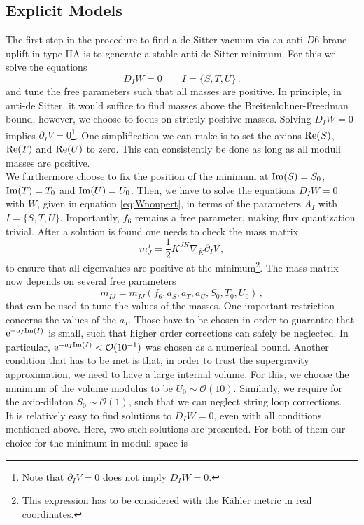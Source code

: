 \documentclass[a4paper,12pt,twoside,openright]{report}
\newcommand{\be}{\begin{equation}}
\newcommand{\ee}{\end{equation}}
\def\rme{{\rm e}}
\def\rmre{{\rm Re}}
\def\rmim{{\rm Im}}
\begin{document}
\subsection{Explicit Models}
\label{sec:uplfitbraneexamples}
The first step in the procedure to find a de Sitter vacuum via an anti-$D6$-brane uplift in type IIA is to generate a stable anti-de Sitter minimum. For this we solve the equations
\be 
D_I W = 0 \qquad I = \{S,T,U\}\,.
\ee
and tune the free parameters such that all masses are positive. In principle, in anti-de Sitter, it would suffice to find masses above the Breitenlohner-Freedman bound, however, we choose to focus on strictly positive masses. Solving $D_I W = 0$ implies $\partial_I V=0$\footnote{Note that $\partial_I V=0$ does not imply $D_I W = 0$.}. One simplification we can make is to set the axions $\rmre(S)$, $\rmre(T)$ and $\rmre(U)$ to zero. This can consistently be done as long as all moduli masses are positive.\\
We furthermore choose to fix the position of the minimum at $\rmim (S) = S_0$, $\rmim (T) = T_0$ and $\rmim (U) = U_0$. Then, we have to solve the equations $D_IW = 0$ with $W$, given in equation \eqref{eq:Wnonpert}, in terms of the parameters $A_I$ with $I = \{S,T,U\}$. Importantly, $f_6$ remains a free parameter, making flux quantization trivial. After a solution is found one needs to check the mass matrix
\be 
m_J^I = \frac{1}{2} K^{J\bar{K}} \nabla_{\bar{K}} \partial_I V\,,
\ee 
to ensure that all eigenvalues are positive at the minimum\footnote{This expression has to be considered with the Kähler metric in real coordinates.}. The mass matrix now depends on several free parameters
\be 
m_{IJ} = m_{IJ}(f_6,a_S,a_T,a_U,S_0,T_0,U_0)\,,
\ee
that can be used to tune the values of the masses. One important restriction concerns the values of the $a_I$. Those have to be chosen in order to guarantee that $\rme^{-a_I \rmim (I)}$ is small, such that higher order corrections can safely be neglected. In particular, $\rme^{-a_I \rmim (I)} < \mathcal{O}(10^{-1})$ was chosen as a numerical bound. Another condition that has to be met is that, in order to trust the supergravity approximation, we need to have a large internal volume. For this, we choose the minimum of the volume modulus to be $U_0 \sim \mathcal{O}(10)$. Similarly, we require for the axio-dilaton $S_0 \sim \mathcal{O}(1)$, such that we can neglect string loop corrections.\\
It is relatively easy to find solutions to $D_IW=0$, even with all conditions mentioned above. Here, two such solutions are presented. For both of them our choice for the minimum in moduli space is
\end{document}
